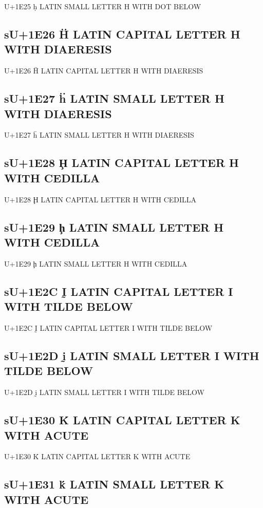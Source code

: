 U+1E25 ḥ LATIN SMALL LETTER H WITH DOT BELOW

\subsection{sU+1E26 Ḧ LATIN CAPITAL LETTER H WITH DIAERESIS}

U+1E26 Ḧ LATIN CAPITAL LETTER H WITH DIAERESIS

\subsection{sU+1E27 ḧ LATIN SMALL LETTER H WITH DIAERESIS}

U+1E27 ḧ LATIN SMALL LETTER H WITH DIAERESIS

\subsection{sU+1E28 Ḩ LATIN CAPITAL LETTER H WITH CEDILLA}

U+1E28 Ḩ LATIN CAPITAL LETTER H WITH CEDILLA

\subsection{sU+1E29 ḩ LATIN SMALL LETTER H WITH CEDILLA}

U+1E29 ḩ LATIN SMALL LETTER H WITH CEDILLA

\subsection{sU+1E2C Ḭ LATIN CAPITAL LETTER I WITH TILDE BELOW}

U+1E2C Ḭ LATIN CAPITAL LETTER I WITH TILDE BELOW

\subsection{sU+1E2D ḭ LATIN SMALL LETTER I WITH TILDE BELOW}

U+1E2D ḭ LATIN SMALL LETTER I WITH TILDE BELOW

\subsection{sU+1E30 Ḱ LATIN CAPITAL LETTER K WITH ACUTE}

U+1E30 Ḱ LATIN CAPITAL LETTER K WITH ACUTE

\subsection{sU+1E31 ḱ LATIN SMALL LETTER K WITH ACUTE}

